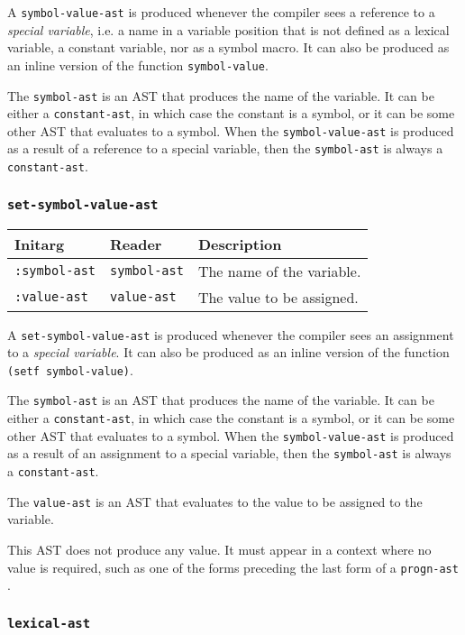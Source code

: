 A \texttt{symbol-value-ast} is produced whenever the compiler sees a
reference to a \emph{special variable}, i.e. a name in a variable
position that is not defined as a lexical variable, a constant
variable, nor as a symbol macro.  It can also be produced as an inline
version of the function \texttt{symbol-value}.

The \texttt{symbol-ast} is an AST that produces the name of the
variable.  It can be either a \texttt{constant-ast}, in which case the
constant is a symbol, or it can be some other AST that evaluates to a
symbol.  When the \texttt{symbol-value-ast} is produced as a result of
a reference to a special variable, then the \texttt{symbol-ast} is
always a \texttt{constant-ast}.

\subsubsection{\texttt{set-symbol-value-ast}}
\label{set-symbol-value-ast}

\begin{tabular}{|l|l|l|}
\hline
Initarg & Reader & Description\\
\hline\hline
\texttt{:symbol-ast} & \texttt{symbol-ast} & The name of the variable.\\  
\hline
\texttt{:value-ast} & \texttt{value-ast} & The value to be assigned.\\  
\hline
\end{tabular}

A \texttt{set-symbol-value-ast} is produced whenever the compiler sees
an assignment to a \emph{special variable}.  It can also be produced
as an inline version of the function \texttt{(setf symbol-value)}.

The \texttt{symbol-ast} is an AST that produces the name of the
variable.  It can be either a \texttt{constant-ast}, in which case the
constant is a symbol, or it can be some other AST that evaluates to a
symbol.  When the \texttt{symbol-value-ast} is produced as a result of
an assignment to a special variable, then the \texttt{symbol-ast} is
always a \texttt{constant-ast}.

The \texttt{value-ast} is an AST that evaluates to the value to be
assigned to the variable.

This AST does not produce any value.  It must appear in a context
where no value is required, such as one of the forms preceding the
last form of a \texttt{progn-ast} .

\subsubsection{\texttt{lexical-ast}}
\label{lexical-ast}

